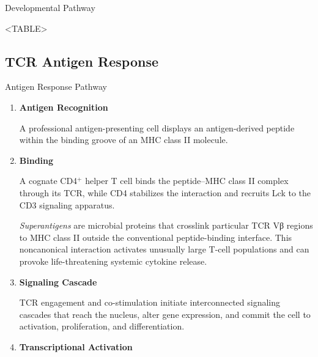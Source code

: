     \begin{core}{Developmental Pathway}

      <TABLE>

    \end{core}

  \subsection{TCR Antigen Response}

    \begin{core}{Antigen Response Pathway}

      \begin{enumerate}[label=(\arabic*)]

        \item \textbf{Antigen Recognition}

          A professional antigen-presenting cell displays an antigen-derived peptide within the binding groove of an MHC class II molecule.

        \item \textbf{Binding}

          A cognate CD4$^+$ helper T cell binds the peptide--MHC class II complex through its TCR, while CD4 stabilizes the interaction and recruits Lck to the CD3 signaling apparatus.

          \textit{Superantigens} are microbial proteins that crosslink particular TCR Vβ regions to MHC class II outside the conventional peptide-binding interface. This noncanonical interaction activates unusually large T-cell populations and can provoke life-threatening systemic cytokine release.

        \item \textbf{Signaling Cascade}

          TCR engagement and co-stimulation initiate interconnected signaling cascades that reach the nucleus, alter gene expression, and commit the cell to activation, proliferation, and differentiation.

        \item \textbf{Transcriptional Activation}


\end{enumerate}
\end{core}
